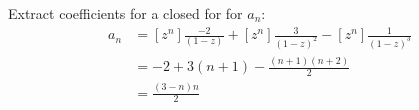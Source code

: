 \documentclass[11pt, oneside]{article}   	%
\begin{document}
Extract coefficients for a closed for for $a_n$:
\begin{align*}
	a_n &= \left[z^n\right] \frac{-2}{(1-z)} + \left[z^n\right] \frac{3}{(1-z)^2} - \left[z^n\right] \frac{1}{(1-z)^3} \\
		&= -2 + 3(n+1) - \frac{(n+1)(n+2)}{2} \\
		&= \frac{(3-n)n}{2} 
\end{align*}
\end{document}
